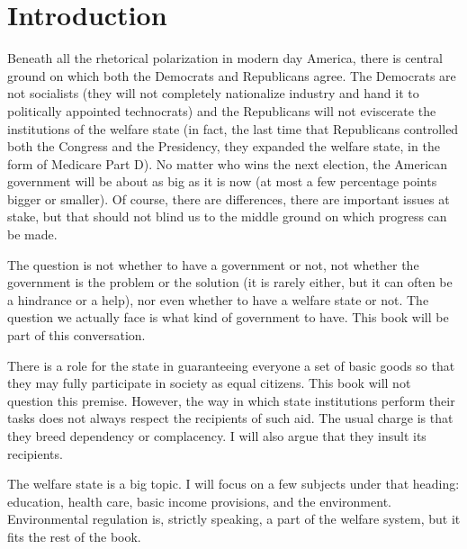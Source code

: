 \chapter{Introduction}

Beneath all the rhetorical polarization in modern day America, there is central
ground on which both the Democrats and Republicans agree. The Democrats are not
socialists (they will not completely nationalize industry and hand it to
politically appointed technocrats) and the Republicans will not eviscerate the
institutions of the welfare state (in fact, the last time that Republicans
controlled both the Congress and the Presidency, they expanded the welfare
state, in the form of Medicare Part D). No matter who wins the next election,
the American government will be about as big as it is now (at most a few
percentage points bigger or smaller). Of course, there are differences, there
are important issues at stake, but that should not blind us to the middle
ground on which progress can be made.

The question is not whether to have a government or not, not whether the
government is the problem or the solution (it is rarely either, but it can
often be a hindrance or a help), nor even whether to have a welfare state or
not. The question we actually face is what kind of government to have. This
book will be part of this conversation.

There is a role for the state in guaranteeing everyone a set of basic goods so
that they may fully participate in society as equal citizens. This book will
not question this premise. However, the way in which state institutions perform
their tasks does not always respect the recipients of such aid. The usual
charge is that they breed dependency or complacency. I will also argue that
they insult its recipients.

\bigskip
\bigskip

The welfare state is a big topic. I will focus on a few subjects under that
heading: education, health care, basic income provisions, and the environment.
Environmental regulation is, strictly speaking, a part of the welfare system,
but it fits the rest of the book.

